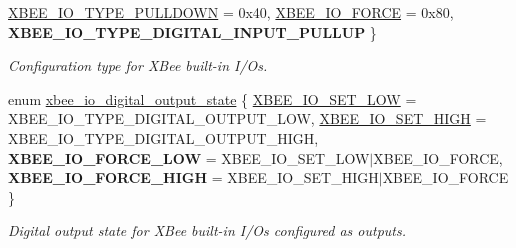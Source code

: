 \begin{DoxyCompactItemize}
\hyperlink{group__xbee__io_ggac23a55c53310f865d9ed2381e331a438a74522e6465b22217ea88fec09cf6601c}{X\+B\+E\+E\+\_\+\+I\+O\+\_\+\+T\+Y\+P\+E\+\_\+\+P\+U\+L\+L\+D\+O\+WN} = 0x40, 
\newline
\hyperlink{group__xbee__io_ggac23a55c53310f865d9ed2381e331a438a4566a81606cd9dbd9ec84207a02a5936}{X\+B\+E\+E\+\_\+\+I\+O\+\_\+\+F\+O\+R\+CE} = 0x80, 
{\bfseries X\+B\+E\+E\+\_\+\+I\+O\+\_\+\+T\+Y\+P\+E\+\_\+\+D\+I\+G\+I\+T\+A\+L\+\_\+\+I\+N\+P\+U\+T\+\_\+\+P\+U\+L\+L\+UP}
 \}\begin{DoxyCompactList}\small\item\em Configuration type for X\+Bee built-\/in I/\+Os. \end{DoxyCompactList}
\item 
enum \hyperlink{group__xbee__io_gaf104a10d2bc34550b99de92fe3564cd2}{xbee\+\_\+io\+\_\+digital\+\_\+output\+\_\+state} \{ \hyperlink{group__xbee__io_ggaf104a10d2bc34550b99de92fe3564cd2ab51805fa21200aa69c1b83b718e8a48b}{X\+B\+E\+E\+\_\+\+I\+O\+\_\+\+S\+E\+T\+\_\+\+L\+OW} = X\+B\+E\+E\+\_\+\+I\+O\+\_\+\+T\+Y\+P\+E\+\_\+\+D\+I\+G\+I\+T\+A\+L\+\_\+\+O\+U\+T\+P\+U\+T\+\_\+\+L\+OW, 
\hyperlink{group__xbee__io_ggaf104a10d2bc34550b99de92fe3564cd2a252b4619d7e663b9b816389c34731bd7}{X\+B\+E\+E\+\_\+\+I\+O\+\_\+\+S\+E\+T\+\_\+\+H\+I\+GH} = X\+B\+E\+E\+\_\+\+I\+O\+\_\+\+T\+Y\+P\+E\+\_\+\+D\+I\+G\+I\+T\+A\+L\+\_\+\+O\+U\+T\+P\+U\+T\+\_\+\+H\+I\+GH, 
{\bfseries X\+B\+E\+E\+\_\+\+I\+O\+\_\+\+F\+O\+R\+C\+E\+\_\+\+L\+OW} = X\+B\+E\+E\+\_\+\+I\+O\+\_\+\+S\+E\+T\+\_\+\+L\+O\+W$\vert$\+X\+B\+E\+E\+\_\+\+I\+O\+\_\+\+F\+O\+R\+CE, 
{\bfseries X\+B\+E\+E\+\_\+\+I\+O\+\_\+\+F\+O\+R\+C\+E\+\_\+\+H\+I\+GH} = X\+B\+E\+E\+\_\+\+I\+O\+\_\+\+S\+E\+T\+\_\+\+H\+I\+G\+H$\vert$\+X\+B\+E\+E\+\_\+\+I\+O\+\_\+\+F\+O\+R\+CE
 \}\begin{DoxyCompactList}\small\item\em Digital output state for X\+Bee built-\/in I/\+Os configured as outputs. \end{DoxyCompactList}
\end{DoxyCompactItemize}
